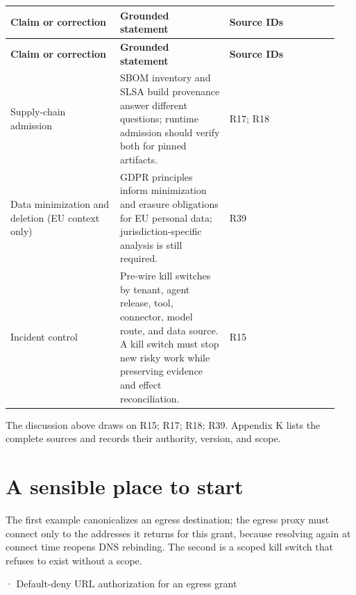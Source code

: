 \BookTableStart
\small
\begin{longtable}{@{}Y{0.3133\linewidth}Y{0.3133\linewidth}Y{0.3133\linewidth}@{}}
\color{white}\bfseries \textbf{Claim or correction} & \color{white}\bfseries \textbf{Grounded statement} & \color{white}\bfseries \textbf{Source IDs} \\
\endfirsthead
{}
\color{white}\bfseries \textbf{Claim or correction} & \color{white}\bfseries \textbf{Grounded statement} & \color{white}\bfseries \textbf{Source IDs} \\
\endhead
Supply-chain admission & SBOM inventory and SLSA build provenance answer different questions; runtime admission should verify both for pinned artifacts. & R17; R18 \\
Data minimization and deletion (EU context only) & GDPR principles inform minimization and erasure obligations for EU personal data; jurisdiction-specific analysis is still required. & R39 \\
Incident control & Pre-wire kill switches by tenant, agent release, tool, connector, model route, and data source. A kill switch must stop new risky work while preserving evidence and effect reconciliation. & R15 \\
\end{longtable}
\BookTableEnd

The discussion above draws on R15; R17; R18; R39. Appendix K lists the complete sources and records their authority, version, and scope.\par

\section{A sensible place to start}

The first example canonicalizes an egress destination; the egress proxy must connect only to the addresses it returns for this grant, because resolving again at connect time reopens DNS rebinding. The second is a scoped kill switch that refuses to exist without a scope.\par

\BookSnake · Default-deny URL authorization for an egress grant\par

